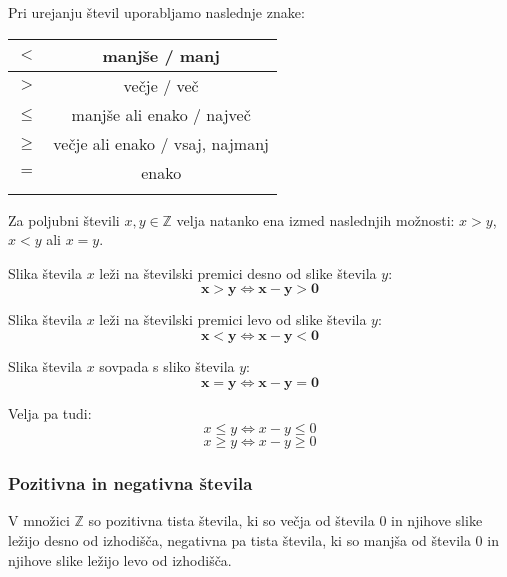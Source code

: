     
        Pri urejanju števil uporabljamo naslednje znake:
        \begin{table}[H]
            \centering
            \addtolength{\tabcolsep}{6pt}
            \renewcommand{\arraystretch}{1.4}                
            \begin{tabular}{||c|c||} 
                \hhline{|t:==:t|}
                        $\mathbf{<}$ & manjše / manj  \\ 
                \hline
                        $\mathbf{>}$ & večje / več   \\ 
                \hline
                        $\mathbf{\leq}$ & manjše ali enako / največ   \\ 
                \hline
                        $\mathbf{\geq}$ & večje ali enako / vsaj, najmanj \\  
                \hline
                        $\mathbf{=}$ & enako \\
                \hhline{|b:==:b|}
            \end{tabular}
        \end{table}
    



    
        Za poljubni števili $x,y\in\mathbb{Z}$ velja natanko ena izmed naslednjih možnosti: $x>y$, $x<y$ ali $x=y$.
    \newline

            Slika števila $x$ leži na številski premici desno od slike števila $y$:
        $$\mathbf{x>y \Leftrightarrow x-y>0}$$
    

            Slika števila $x$ leži na številski premici levo od slike števila $y$:
        $$\mathbf{x<y \Leftrightarrow x-y<0}$$
    

            Slika števila $x$ sovpada s sliko števila $y$:
        $$\mathbf{x=y \Leftrightarrow x-y=0}$$
    \newline

    
        Velja pa tudi:
        $$x\leq y \Leftrightarrow x-y\leq 0 $$
        $$x\geq y \Leftrightarrow x-y\geq 0 $$


    \subsubsection*{Pozitivna in negativna števila}
        V množici $\mathbb{Z}$ so pozitivna tista števila, ki so večja od števila $0$ 
        in njihove slike ležijo desno od izhodišča, 
        negativna pa tista števila, ki so manjša od števila $0$ 
        in njihove slike ležijo levo od izhodišča.
    
